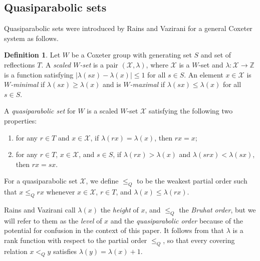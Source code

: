 \documentclass[11pt]{amsart}
\theoremstyle{plain}
\theoremstyle{definition}
\newtheorem{defn}[theorem]{Definition}
\theoremstyle{remark}
\numberwithin{equation}{subsection}
\newcommand{\Z}{{\mathbb Z}}
\begin{document}
\subsection{Quasiparabolic sets}
Quasiparabolic sets were introduced by Rains and Vazirani for a general Coxeter
system as follows.

\begin{defn}
\cite[Section 2, Section 5]{rains13}
\label{def:qpset}
Let $W$ be a Coxeter group with generating set $S$ and set of reflections $T$. A
{\it scaled $W$-set} is a pair $(\mathcal{X}, \lambda)$, where $\mathcal{X}$ is a $W$-set and
$\lambda : \mathcal{X} \rightarrow \Z$ is a function satisfying $|\lambda(sx) -
\lambda(x)| \leq 1$ for all $s \in S$.  An element $x \in \mathcal{X}$ is {\it
$W$-minimal}  if $\lambda(sx) \geq \lambda(x)$ and is {\it $W$-maximal} if
$\lambda(sx) \leq \lambda(x)$ for all $s \in S$.

A {\it quasiparabolic set} for $W$ is a scaled $W$-set $\mathcal{X}$ satisfying the
following two properties:
\begin{enumerate}
    \item[(QP1)] for any $r \in T$ and $x \in \mathcal{X}$, if $\lambda(rx) = \lambda(x)$,
     then $rx = x$;
 \item[(QP2)] for any $r \in T$, $x \in \mathcal{X}$, and $s \in S$, if $\lambda(rx) >
     \lambda(x)$ and $\lambda(srx) < \lambda(sx)$, then $rx = sx$.
\end{enumerate} For a quasiparabolic set $\mathcal{X}$, we define $\le_Q$ to be the weakest
partial order such that $x \leq_Q rx$ whenever $x \in \mathcal{X}$, $r \in T$, and
    $\lambda(x) \leq \lambda(rx)$.
\end{defn}

Rains and Vazirani call $\lambda(x)$ the {\it height} of $x$, and $\leq_Q$ the
{\it Bruhat order}, but we will refer to them as the {\it level} of $x$ and the
{\it quasiparabolic order} because of the potential for confusion in the context
of this paper. It follows from \cite[Proposition 5.16]{rains13} that $\lambda$
is a rank function with respect to the partial order $\leq_Q$, so that every
covering relation $x <_Q y$ satisfies $\lambda(y) = \lambda(x) + 1$.
\end{document}
